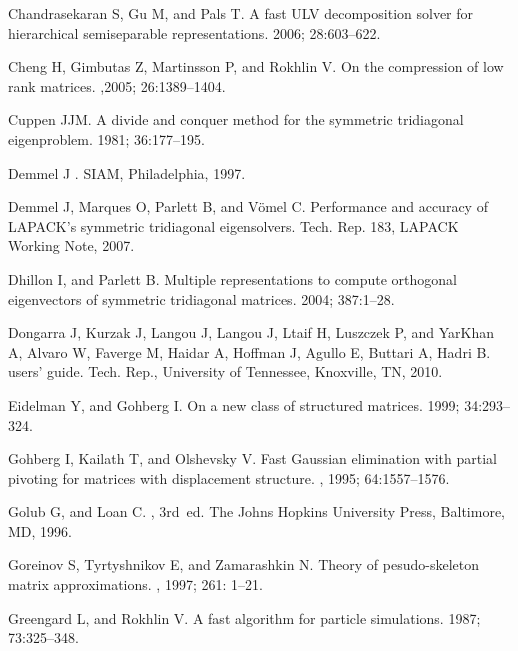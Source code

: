 \documentclass[times]{nlaauth}
\newcounter{algorithm}
\begin{document}
\begin{thebibliography}{99}
{  Chandrasekaran S, Gu M, and Pals T.}
\newblock A fast {ULV} decomposition solver for hierarchical semiseparable
  representations.
 2006; 28:603--622.

{  Cheng H, Gimbutas Z, Martinsson P, and Rokhlin V.}
\newblock On the compression of low rank matrices.
,2005; 26:1389--1404.

{  Cuppen JJM.}
\newblock A divide and conquer method for the symmetric tridiagonal
  eigenproblem.
 1981; 36:177--195.

{  Demmel J}
.
\newblock SIAM, Philadelphia, 1997.

{  Demmel J, Marques O, Parlett B, and V\"{o}mel C.}
\newblock Performance and accuracy of {LAPACK}'s symmetric tridiagonal
  eigensolvers.
\newblock Tech. Rep. 183, LAPACK Working Note, 2007.

{  Dhillon I, and Parlett B.}
\newblock Multiple representations to compute orthogonal eigenvectors of
  symmetric tridiagonal matrices.
 2004; 387:1--28.

{  Dongarra J, Kurzak J, Langou J, Langou J, Ltaif H, Luszczek P, and YarKhan A,
    Alvaro W, Faverge M, Haidar A, Hoffman J, Agullo E, Buttari A, Hadri B. }
 users' guide.
\newblock Tech. Rep., University of Tennessee, Knoxville, TN, 2010.

{  Eidelman Y, and Gohberg I.}
\newblock On a new class of structured matrices.
 1999; 34:293--324.

{  Gohberg I, Kailath T, and Olshevsky V.}
\newblock Fast {Gaussian} elimination with partial pivoting for matrices with
  displacement structure.
, 1995; 64:1557--1576.

{  Golub G, and Loan C.}
, 3rd~ed.
\newblock The Johns Hopkins University Press, Baltimore, MD, 1996.

{Goreinov S, Tyrtyshnikov E, and Zamarashkin N.}
\newblock Theory of pesudo-skeleton matrix approximations.
, 1997; 261: 1--21.

{  Greengard L, and Rokhlin V.}
\newblock A fast algorithm for particle simulations.
 1987;  73:325--348.


\end{thebibliography}
\end{document}
